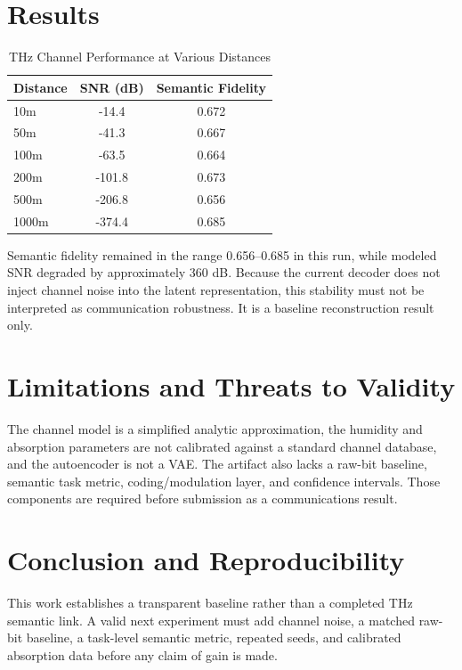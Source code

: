 \documentclass[sigconf]{acmart}
\begin{document}
\section{Results}

\begin{table}[h]
\centering
\caption{THz Channel Performance at Various Distances}
\begin{tabular}{lcc}
\toprule
Distance & SNR (dB) & Semantic Fidelity \\
\midrule
10m & -14.4 & 0.672 \\
50m & -41.3 & 0.667 \\
100m & -63.5 & 0.664 \\
200m & -101.8 & 0.673 \\
500m & -206.8 & 0.656 \\
1000m & -374.4 & 0.685 \\
\bottomrule
\end{tabular}
\end{table}

Semantic fidelity remained in the range 0.656--0.685 in this run, while modeled SNR degraded by approximately 360 dB. Because the current decoder does not inject channel noise into the latent representation, this stability must not be interpreted as communication robustness. It is a baseline reconstruction result only.

\section{Limitations and Threats to Validity}

The channel model is a simplified analytic approximation, the humidity and absorption parameters are not calibrated against a standard channel database, and the autoencoder is not a VAE. The artifact also lacks a raw-bit baseline, semantic task metric, coding/modulation layer, and confidence intervals. Those components are required before submission as a communications result.

\section{Conclusion and Reproducibility}

This work establishes a transparent baseline rather than a completed THz semantic link. A valid next experiment must add channel noise, a matched raw-bit baseline, a task-level semantic metric, repeated seeds, and calibrated absorption data before any claim of gain is made.
\end{document}
